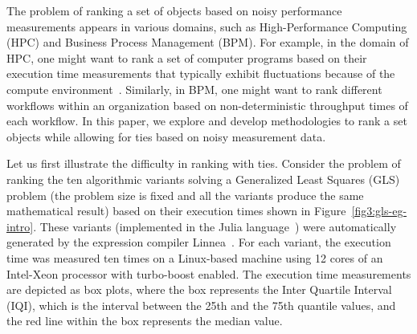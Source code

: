 \documentclass[acmsmall,screen, review]{acmart}
\begin{document}
The problem of ranking a set of objects based on noisy performance measurements appears in various domains, such as High-Performance Computing (HPC) and Business Process Management (BPM). For example, in the domain of HPC, one might want to rank a set of computer programs based on their execution time measurements that typically  exhibit fluctuations because of the compute environment~\cite{nikitenko2021influence}. Similarly, in BPM, one might want to rank different workflows within an organization based on non-deterministic throughput times of each workflow. In this paper, we explore and develop methodologies to rank a set objects while allowing for ties based on noisy measurement data.

Let us first illustrate the difficulty in ranking with ties. Consider the problem of ranking the ten algorithmic variants solving a Generalized Least Squares (GLS) problem (the problem size is fixed and all the variants produce the same mathematical result) based on their execution times shown in Figure~\ref{fig3:gls-eg-intro}.
These variants (implemented in the Julia language~\cite{bezanson2017julia}) were automatically generated by the expression compiler Linnea~\cite{barthels2021linnea}. For each variant, the execution time was measured ten times on a Linux-based machine using 12 cores of an Intel-Xeon processor with turbo-boost enabled. The execution time measurements are depicted as box plots, where the box represents the Inter Quartile Interval (IQI), which is the interval between the 25th and the 75th quantile values,  and the red line within the box represents the median value. 
\end{document}
